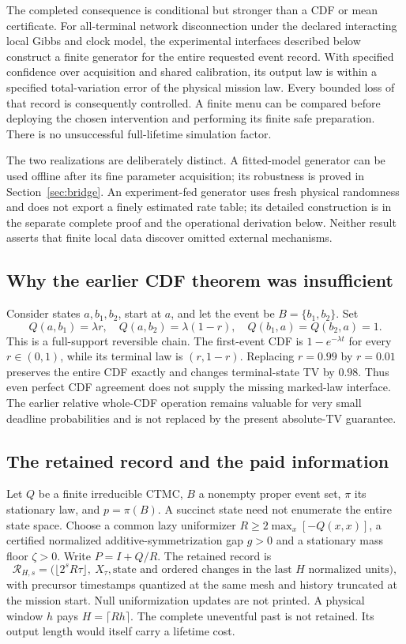 \documentclass[10pt,a4paper]{article}
\begin{document}
The completed consequence is conditional but stronger than a CDF or mean
certificate. For all-terminal network disconnection under the declared
interacting local Gibbs and clock model, the
experimental interfaces described below construct a finite generator for
the entire requested event record. With specified confidence over
acquisition and shared calibration, its output law is within a specified
total-variation error of the physical mission law. Every bounded loss
of that record is consequently controlled. A finite menu can be compared
before deploying the chosen intervention and performing its finite safe
preparation. There is no unsuccessful full-lifetime simulation factor.

The two realizations are deliberately distinct. A fitted-model generator
can be used offline after its fine parameter acquisition; its robustness
is proved in Section~\ref{sec:bridge}. An experiment-fed generator uses
fresh physical randomness and does not export a finely estimated rate
table; its detailed construction is in the separate complete proof and
the operational derivation below. Neither result asserts that finite
local data discover omitted external mechanisms.

\subsection{Why the earlier CDF theorem was insufficient}
Consider states $a,b_1,b_2$, start at $a$, and let the event be
$B=\{b_1,b_2\}$. Set
\[
Q(a,b_1)=\lambda r,\quad Q(a,b_2)=\lambda(1-r),\quad
Q(b_1,a)=Q(b_2,a)=1.
\]
This is a full-support reversible chain. The first-event CDF is
$1-e^{-\lambda t}$ for every $r\in(0,1)$, while its terminal law is
$(r,1-r)$. Replacing $r=0.99$ by $r=0.01$ preserves the entire CDF
exactly and changes terminal-state TV by $0.98$. Thus even perfect CDF
agreement does not supply the missing marked-law interface. The earlier
relative whole-CDF operation remains valuable for very small deadline
probabilities and is not replaced by the present absolute-TV guarantee.

\subsection{The retained record and the paid information}
Let $Q$ be a finite irreducible CTMC, $B$ a nonempty proper event set,
$\pi$ its stationary law, and $p=\pi(B)$. A succinct state need not
enumerate the entire state space. Choose a common lazy uniformizer
$R\ge2\max_x[-Q(x,x)]$, a certified normalized additive-symmetrization
gap $g>0$ and a stationary mass floor $\zeta>0$. Write
$P=I+Q/R$. The retained record is
\[
\mathcal R_{H,s}=
\bigl(\lfloor2^sR\tau\rfloor,\ X_\tau,
\text{state and ordered changes in the last }H\text{ normalized units}\bigr),
\]
with precursor timestamps quantized at the same mesh and history
truncated at the mission start. Null uniformization updates are not
printed. A physical window $h$ pays $H=\lceil Rh\rceil$.
The complete uneventful past is not retained. Its output length would
itself carry a lifetime cost.
\end{document}
